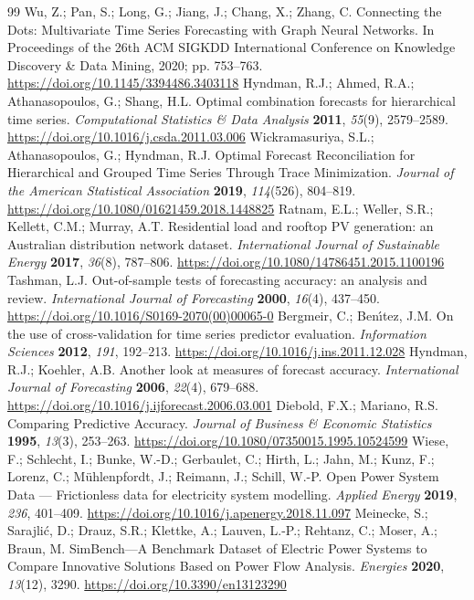 \documentclass[electronics,article,submit,moreauthors]{Definitions/mdpi}
\begin{document}
\begin{thebibliography}{99}
 Wu, Z.; Pan, S.; Long, G.; Jiang, J.; Chang, X.; Zhang, C. Connecting the Dots: Multivariate Time Series Forecasting with Graph Neural Networks. In Proceedings of the 26th ACM SIGKDD International Conference on Knowledge Discovery \& Data Mining, 2020; pp. 753--763. \url{https://doi.org/10.1145/3394486.3403118}
 Hyndman, R.J.; Ahmed, R.A.; Athanasopoulos, G.; Shang, H.L. Optimal combination forecasts for hierarchical time series. \emph{Computational Statistics \& Data Analysis} \textbf{2011}, \emph{55}(9), 2579--2589. \url{https://doi.org/10.1016/j.csda.2011.03.006}
 Wickramasuriya, S.L.; Athanasopoulos, G.; Hyndman, R.J. Optimal Forecast Reconciliation for Hierarchical and Grouped Time Series Through Trace Minimization. \emph{Journal of the American Statistical Association} \textbf{2019}, \emph{114}(526), 804--819. \url{https://doi.org/10.1080/01621459.2018.1448825}
 Ratnam, E.L.; Weller, S.R.; Kellett, C.M.; Murray, A.T. Residential load and rooftop PV generation: an Australian distribution network dataset. \emph{International Journal of Sustainable Energy} \textbf{2017}, \emph{36}(8), 787--806. \url{https://doi.org/10.1080/14786451.2015.1100196}
 Tashman, L.J. Out-of-sample tests of forecasting accuracy: an analysis and review. \emph{International Journal of Forecasting} \textbf{2000}, \emph{16}(4), 437--450. \url{https://doi.org/10.1016/S0169-2070(00)00065-0}
 Bergmeir, C.; Ben\'{\i}tez, J.M. On the use of cross-validation for time series predictor evaluation. \emph{Information Sciences} \textbf{2012}, \emph{191}, 192--213. \url{https://doi.org/10.1016/j.ins.2011.12.028}
 Hyndman, R.J.; Koehler, A.B. Another look at measures of forecast accuracy. \emph{International Journal of Forecasting} \textbf{2006}, \emph{22}(4), 679--688. \url{https://doi.org/10.1016/j.ijforecast.2006.03.001}
 Diebold, F.X.; Mariano, R.S. Comparing Predictive Accuracy. \emph{Journal of Business \& Economic Statistics} \textbf{1995}, \emph{13}(3), 253--263. \url{https://doi.org/10.1080/07350015.1995.10524599}
 Wiese, F.; Schlecht, I.; Bunke, W.-D.; Gerbaulet, C.; Hirth, L.; Jahn, M.; Kunz, F.; Lorenz, C.; M\"{u}hlenpfordt, J.; Reimann, J.; Schill, W.-P. Open Power System Data --- Frictionless data for electricity system modelling. \emph{Applied Energy} \textbf{2019}, \emph{236}, 401--409. \url{https://doi.org/10.1016/j.apenergy.2018.11.097}
 Meinecke, S.; Sarajli\'{c}, D.; Drauz, S.R.; Klettke, A.; Lauven, L.-P.; Rehtanz, C.; Moser, A.; Braun, M. SimBench---A Benchmark Dataset of Electric Power Systems to Compare Innovative Solutions Based on Power Flow Analysis. \emph{Energies} \textbf{2020}, \emph{13}(12), 3290. \url{https://doi.org/10.3390/en13123290}

\end{thebibliography}
\end{document}
